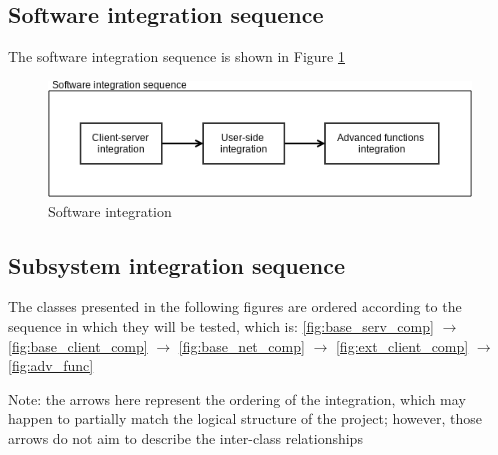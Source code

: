\subsection{Software integration sequence}
The software integration sequence is shown in Figure \ref{fig:soft_int}
\begin{figure} [h]
  \centering
  \includegraphics[scale=0.72]{diagrams/software integration.png}
  \caption{\label{fig:soft_int} Software integration}
\end{figure}

\subsection{Subsystem integration sequence}
The classes presented in the following figures are ordered according to the sequence in which they will be tested, which is:
\ref{fig:base_serv_comp} $\rightarrow$ \ref{fig:base_client_comp} $\rightarrow$ \ref{fig:base_net_comp}
 $\rightarrow$ \ref{fig:ext_client_comp} $\rightarrow$ \ref{fig:adv_func}

Note: the arrows here represent the ordering of the integration, which may happen to partially
match the logical structure of the project; however, those arrows do not aim to describe the inter-class
relationships

